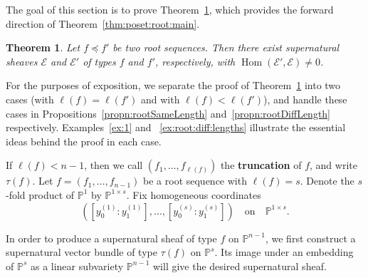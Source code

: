 \documentclass[12pt]{amsart}
\newtheorem{thm}[equation]{Theorem}
\theoremstyle{definition}
\newcommand{\Hom}{\operatorname{Hom}}
\newcommand{\EE}{\mathcal{E}}
\newcommand{\PP}{\mathbb{P}}
\newcommand{\defi}[1]{{\upshape\bfseries #1}}
\begin{document}
The goal of this section is to prove Theorem~\ref{thm:main:root}, which provides
the forward direction of Theorem~\ref{thm:poset:root:main}.

\begin{thm}
\label{thm:main:root}
Let $f\preceq f'$ be two root sequences. 
Then there exist supernatural sheaves 
$\EE$ and $\EE'$ of types $f$ and $f'$, respectively, 
with $\Hom(\EE',\EE)\ne 0$.
\end{thm}

For the purposes of exposition, we separate the proof of
Theorem~\ref{thm:main:root} into two cases (with $\ell(f) = \ell(f')$
and with $\ell(f) < \ell(f')$), and handle these cases in
Propositions~\ref{propn:rootSameLength} and~\ref{propn:rootDiffLength}
respectively. Examples~\ref{ex:1} and ~\ref{ex:root:diff:lengths}
illustrate the essential ideas behind the proof in each case.

If $\ell(f) < n-1$, then we call $(f_1, \ldots, f_{\ell(f)})$ 
the \defi{truncation} of $f$, and write $\tau(f)$.  Let $f=(f_1, \dots,
f_{n-1})$ be a root sequence with $\ell(f)=s$.  Denote the $s$-fold product
of $\PP^1$ by $\PP^{1\times s}$.  Fix homogeneous
coordinates 
\begin{equation}
\label{equation:homogCoordProdPP}
\left([y_0^{(1)}:y_1^{(1)}], \dots, [y_0^{(s)}:y_1^{(s)}]\right)
\quad\text{on}\quad \PP^{1\times s}.
\end{equation}

In order to produce a supernatural sheaf of type $f$ on $\PP^{n-1}$, 
we first construct a supernatural vector bundle of type $\tau(f)$ on $\PP^s$. 
Its image under an embedding of $\PP^s$ as a linear subvariety $\PP^{n-1}$
will give the desired supernatural sheaf.
\end{document}
